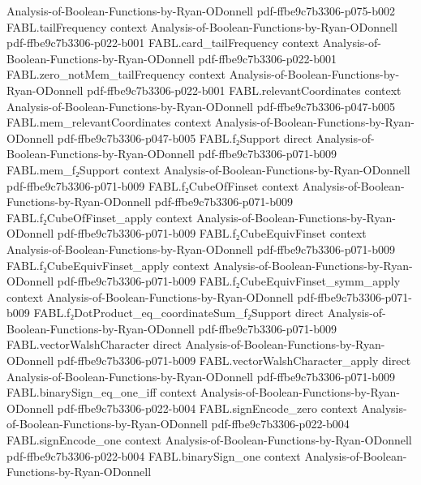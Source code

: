 \begin{theorem}
  {Analysis-of-Boolean-Functions-by-Ryan-ODonnell}
  {pdf-ffbe9c7b3306-p075-b002}
\proofstep
  {FABL.tailFrequency}
  {context}
  {Analysis-of-Boolean-Functions-by-Ryan-ODonnell}
  {pdf-ffbe9c7b3306-p022-b001}
\proofstep
  {FABL.card_tailFrequency}
  {context}
  {Analysis-of-Boolean-Functions-by-Ryan-ODonnell}
  {pdf-ffbe9c7b3306-p022-b001}
\proofstep
  {FABL.zero_notMem_tailFrequency}
  {context}
  {Analysis-of-Boolean-Functions-by-Ryan-ODonnell}
  {pdf-ffbe9c7b3306-p022-b001}
\proofstep
  {FABL.relevantCoordinates}
  {context}
  {Analysis-of-Boolean-Functions-by-Ryan-ODonnell}
  {pdf-ffbe9c7b3306-p047-b005}
\proofstep
  {FABL.mem_relevantCoordinates}
  {context}
  {Analysis-of-Boolean-Functions-by-Ryan-ODonnell}
  {pdf-ffbe9c7b3306-p047-b005}
\proofstep
  {FABL.f₂Support}
  {direct}
  {Analysis-of-Boolean-Functions-by-Ryan-ODonnell}
  {pdf-ffbe9c7b3306-p071-b009}
\proofstep
  {FABL.mem_f₂Support}
  {context}
  {Analysis-of-Boolean-Functions-by-Ryan-ODonnell}
  {pdf-ffbe9c7b3306-p071-b009}
\proofstep
  {FABL.f₂CubeOfFinset}
  {context}
  {Analysis-of-Boolean-Functions-by-Ryan-ODonnell}
  {pdf-ffbe9c7b3306-p071-b009}
\proofstep
  {FABL.f₂CubeOfFinset_apply}
  {context}
  {Analysis-of-Boolean-Functions-by-Ryan-ODonnell}
  {pdf-ffbe9c7b3306-p071-b009}
\proofstep
  {FABL.f₂CubeEquivFinset}
  {context}
  {Analysis-of-Boolean-Functions-by-Ryan-ODonnell}
  {pdf-ffbe9c7b3306-p071-b009}
\proofstep
  {FABL.f₂CubeEquivFinset_apply}
  {context}
  {Analysis-of-Boolean-Functions-by-Ryan-ODonnell}
  {pdf-ffbe9c7b3306-p071-b009}
\proofstep
  {FABL.f₂CubeEquivFinset_symm_apply}
  {context}
  {Analysis-of-Boolean-Functions-by-Ryan-ODonnell}
  {pdf-ffbe9c7b3306-p071-b009}
\proofstep
  {FABL.f₂DotProduct_eq_coordinateSum_f₂Support}
  {direct}
  {Analysis-of-Boolean-Functions-by-Ryan-ODonnell}
  {pdf-ffbe9c7b3306-p071-b009}
\proofstep
  {FABL.vectorWalshCharacter}
  {direct}
  {Analysis-of-Boolean-Functions-by-Ryan-ODonnell}
  {pdf-ffbe9c7b3306-p071-b009}
\proofstep
  {FABL.vectorWalshCharacter_apply}
  {direct}
  {Analysis-of-Boolean-Functions-by-Ryan-ODonnell}
  {pdf-ffbe9c7b3306-p071-b009}
\proofstep
  {FABL.binarySign_eq_one_iff}
  {context}
  {Analysis-of-Boolean-Functions-by-Ryan-ODonnell}
  {pdf-ffbe9c7b3306-p022-b004}
\proofstep
  {FABL.signEncode_zero}
  {context}
  {Analysis-of-Boolean-Functions-by-Ryan-ODonnell}
  {pdf-ffbe9c7b3306-p022-b004}
\proofstep
  {FABL.signEncode_one}
  {context}
  {Analysis-of-Boolean-Functions-by-Ryan-ODonnell}
  {pdf-ffbe9c7b3306-p022-b004}
\proofstep
  {FABL.binarySign_one}
  {context}
  {Analysis-of-Boolean-Functions-by-Ryan-ODonnell}

\end{theorem}
